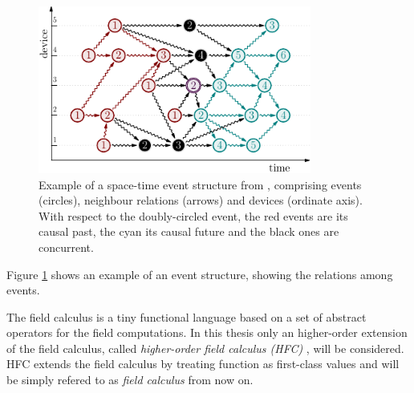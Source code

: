 \begin{figure}
\centering
\includegraphics[width=0.8\textwidth]{imgs/structure.pdf}	
\caption{Example of a space-time event structure from \cite{Share}, comprising events (circles), neighbour relations (arrows) and devices (ordinate axis). With respect to the doubly-circled event, the red events are its causal past, the cyan its causal future and the black ones are concurrent.}
\label{fig:eventstructure}
\end{figure}

Figure \ref{fig:eventstructure} shows an example of an event structure, showing the relations among events.

The field calculus is a tiny functional language based on a set of abstract operators for the field computations. In this thesis only an higher-order extension of the field calculus, called \textit{higher-order field calculus (HFC)} \cite{FieldCalculus}, will be considered. HFC extends the field calculus by treating function as first-class values and will be simply refered to as \textit{field calculus} from now on.

